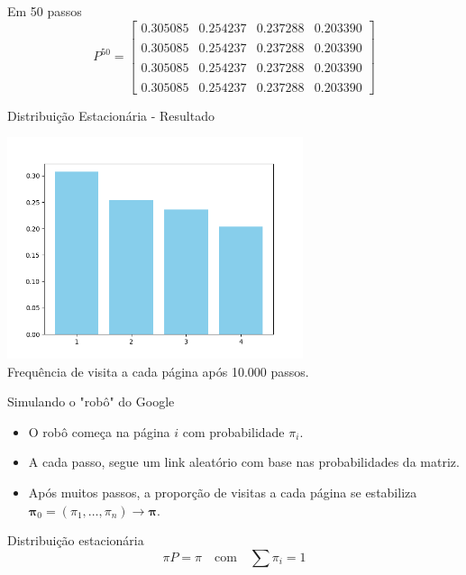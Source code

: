 \documentclass{beamer}
\begin{document}
\begin{frame}{Em 50 passos}
  \[
    P^{50} =
    \begin{bmatrix}
      0.305085 & 0.254237 & 0.237288 & 0.203390 \\\\
      0.305085 & 0.254237 & 0.237288 & 0.203390 \\\\
      0.305085 & 0.254237 & 0.237288 & 0.203390 \\\\
      0.305085 & 0.254237 & 0.237288 & 0.203390
    \end{bmatrix}
\]
\end{frame}


\begin{frame}{Distribuição Estacionária - Resultado}
\begin{center}
\includegraphics[width=0.65\textwidth]{stationary_dist.png} \\
Frequência de visita a cada página após 10.000 passos.
\end{center}
\end{frame}


\begin{frame}{Simulando o "robô" do Google}
  \begin{itemize}
  \item O robô começa na página $i$ com probabilidade $\pi_i$.
  \item A cada passo, segue um link aleatório com base nas
    probabilidades da matriz.
  \item Após muitos passos, a proporção de visitas a cada página se
    estabiliza $\bm\pi_0 = (\pi_1,\dots,\pi_n) \to\bm\pi$. 
  \end{itemize}
  \begin{block}{Distribuição estacionária}
    \[ \pi P = \pi \quad \text{com} \quad \sum \pi_i = 1 \]
  \end{block}
\end{frame}
\end{document}
